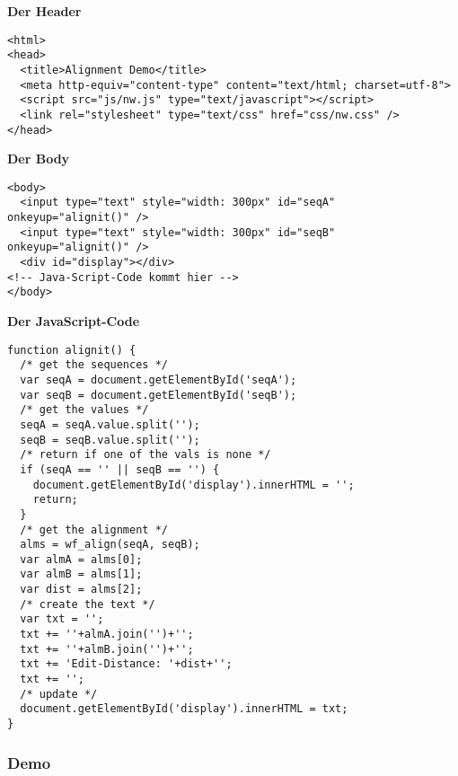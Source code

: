 \vspace{0.5cm}\par\noindent\textbf{Der Header}\vspace{0.5cm}

\begin{verbatim}
<html>
<head>
  <title>Alignment Demo</title>
  <meta http-equiv="content-type" content="text/html; charset=utf-8">
  <script src="js/nw.js" type="text/javascript"></script>
  <link rel="stylesheet" type="text/css" href="css/nw.css" />
</head>
\end{verbatim}



\vspace{0.5cm}\par\noindent\textbf{Der Body}\vspace{0.5cm}

\begin{verbatim}
<body>
  <input type="text" style="width: 300px" id="seqA" onkeyup="alignit()" />
  <input type="text" style="width: 300px" id="seqB" onkeyup="alignit()" />
  <div id="display"></div>
<!-- Java-Script-Code kommt hier -->
</body>
\end{verbatim}



\vspace{0.5cm}\par\noindent\textbf{Der JavaScript-Code}\vspace{0.5cm}

\begin{verbatim}
function alignit() {
  /* get the sequences */
  var seqA = document.getElementById('seqA');
  var seqB = document.getElementById('seqB');
  /* get the values */
  seqA = seqA.value.split('');
  seqB = seqB.value.split('');
  /* return if one of the vals is none */
  if (seqA == '' || seqB == '') {
    document.getElementById('display').innerHTML = '';
    return;
  }
  /* get the alignment */
  alms = wf_align(seqA, seqB);
  var almA = alms[0];
  var almB = alms[1];
  var dist = alms[2];
  /* create the text */
  var txt = '';
  txt += ''+almA.join('')+'';
  txt += ''+almB.join('')+'';
  txt += 'Edit-Distance: '+dist+'';
  txt += '';
  /* update */
  document.getElementById('display').innerHTML = txt;
}
\end{verbatim}


\subsubsection{\texorpdfstring{{Demo}}{Demo}}

